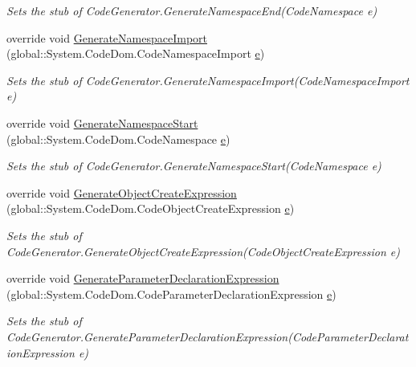 \begin{DoxyCompactItemize}
\begin{DoxyCompactList}\small\item\em Sets the stub of Code\-Generator.\-Generate\-Namespace\-End(\-Code\-Namespace e)\end{DoxyCompactList}\item 
override void \hyperlink{class_system_1_1_code_dom_1_1_compiler_1_1_fakes_1_1_stub_code_compiler_acd7b76ee83f3dfb7842256d7c008c4b8}{Generate\-Namespace\-Import} (global\-::\-System.\-Code\-Dom.\-Code\-Namespace\-Import \hyperlink{jquery-1_810_82_8min_8js_a2c038346d47955cbe2cb91e338edd7e1}{e})
\begin{DoxyCompactList}\small\item\em Sets the stub of Code\-Generator.\-Generate\-Namespace\-Import(\-Code\-Namespace\-Import e)\end{DoxyCompactList}\item 
override void \hyperlink{class_system_1_1_code_dom_1_1_compiler_1_1_fakes_1_1_stub_code_compiler_a5f54cb2dbd30a4185243353872cf5815}{Generate\-Namespace\-Start} (global\-::\-System.\-Code\-Dom.\-Code\-Namespace \hyperlink{jquery-1_810_82_8min_8js_a2c038346d47955cbe2cb91e338edd7e1}{e})
\begin{DoxyCompactList}\small\item\em Sets the stub of Code\-Generator.\-Generate\-Namespace\-Start(\-Code\-Namespace e)\end{DoxyCompactList}\item 
override void \hyperlink{class_system_1_1_code_dom_1_1_compiler_1_1_fakes_1_1_stub_code_compiler_a256285ff9b1429a01526412b96f56c86}{Generate\-Object\-Create\-Expression} (global\-::\-System.\-Code\-Dom.\-Code\-Object\-Create\-Expression \hyperlink{jquery-1_810_82_8min_8js_a2c038346d47955cbe2cb91e338edd7e1}{e})
\begin{DoxyCompactList}\small\item\em Sets the stub of Code\-Generator.\-Generate\-Object\-Create\-Expression(\-Code\-Object\-Create\-Expression e)\end{DoxyCompactList}\item 
override void \hyperlink{class_system_1_1_code_dom_1_1_compiler_1_1_fakes_1_1_stub_code_compiler_a9e6c53a0708599fb6838548cddeff0d1}{Generate\-Parameter\-Declaration\-Expression} (global\-::\-System.\-Code\-Dom.\-Code\-Parameter\-Declaration\-Expression \hyperlink{jquery-1_810_82_8min_8js_a2c038346d47955cbe2cb91e338edd7e1}{e})
\begin{DoxyCompactList}\small\item\em Sets the stub of Code\-Generator.\-Generate\-Parameter\-Declaration\-Expression(\-Code\-Parameter\-Declaration\-Expression e)\end{DoxyCompactList}\item 

\end{DoxyCompactItemize}

